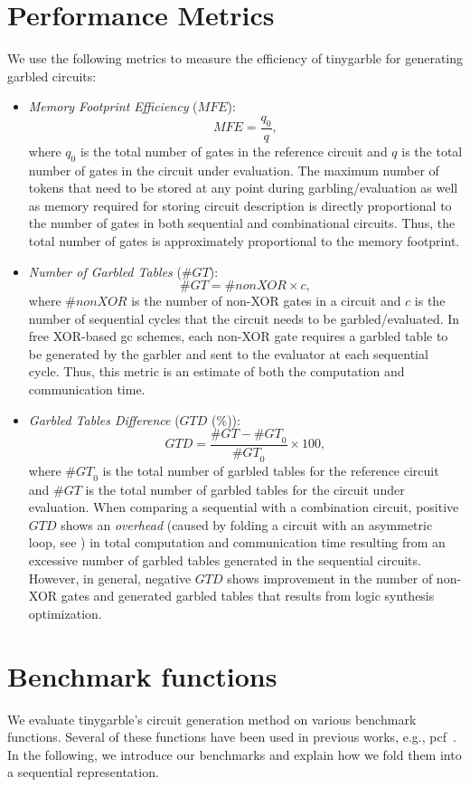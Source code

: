 \section{Performance Metrics}
We use the following metrics to measure the efficiency of \gls{tinygarble} for generating garbled circuits:

\begin{itemize}
\item
	\textit{Memory Footprint Efficiency} ($\mathit{MFE}$): $$\mathit{MFE} = \dfrac{q_{0}}{q},$$ where $q_{0}$ is the total number of gates in the reference circuit and $q$ is the total number of gates in the circuit under evaluation.
	The maximum number of tokens that need to be stored at any point during garbling/evaluation as well as memory required for storing circuit description is directly proportional to the number of gates in both sequential and combinational circuits.
	Thus, the total number of gates is approximately proportional to the memory footprint.

\item
	\textit{Number of Garbled Tables} ($\mathit{\#GT}$): $$\mathit{\#GT} = \#nonXOR\times c,$$ where $\#nonXOR$ is the number of non-XOR gates in a circuit and $c$ is the number of sequential cycles that the circuit needs to be garbled/evaluated.
	In free XOR-based \acrshort{gc} schemes, each non-XOR gate requires a garbled table to be generated by the garbler and sent to the evaluator at each sequential cycle.
	Thus, this metric is an estimate of both the computation and communication time.

\item
	\textit{Garbled Tables Difference} ($\mathit{GTD}$ (\%)): $$\mathit{GTD} = \dfrac{\mathit{\#GT} - \mathit{\#GT}_{0}}{\mathit{\#GT}_{0}} \times 100,$$ where $\mathit{\#GT}_{0}$ is the total number of garbled tables for the reference circuit and $\mathit{\#GT}$ is the total number of garbled tables for the circuit under evaluation.
	When comparing a sequential with a combination circuit, positive $\mathit{GTD}$ shows an \emph{overhead} (caused by folding a circuit with an asymmetric loop, see ) in total computation and communication time resulting from an excessive number of garbled tables generated in the sequential circuits.
	However, in general, negative $\mathit{GTD}$ shows improvement in the number of non-XOR gates and generated garbled tables that results from logic synthesis optimization.
\end{itemize}

\section{Benchmark functions}
We evaluate \gls{tinygarble}'s circuit generation method on various benchmark functions.
Several of these functions have been used in previous works, e.g., \gls{pcf}~\cite{kreuter2013pcf}.
In the following, we introduce our benchmarks and explain how we fold them into a sequential representation.

